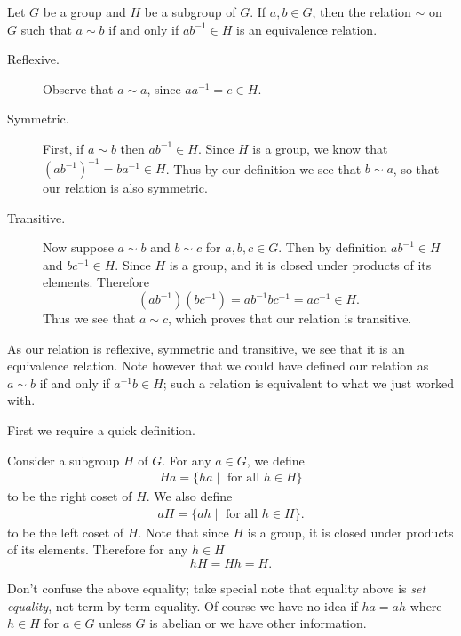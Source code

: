 \documentclass[12pt,letterpaper]{algebra_book}
\theoremstyle{definition}
\begin{document}
    Let $G$ be a group and $H$ be a subgroup of $G$. If $a, b \in G$, then the
    relation $\sim$ on $G$ such that $a \sim b$ if and only if $ab^{-1} \in H$
    is an equivalence relation.
  \begin{prf}
    \begin{description}
        \item[Reflexive.] Observe that $a \sim a$, since $aa^{-1} = e
        \in H$.

        \item[Symmetric.] First, if $a \sim b$ then $ab^{-1} \in H$. Since $H$ is a
        group, we know that $(ab^{-1})^{-1} = ba^{-1} \in H$.
        Thus by our definition we see that $b \sim a$, so that our
        relation is also symmetric. 

        \item[Transitive.] Now suppose $a \sim b$ and $b \sim c$ for
        $a, b, c \in G$. Then by definition $ab^{-1} \in H$ and
        $bc^{-1} \in H$. Since $H$ is a group, and it is closed under
        products of its elements. Therefore
        \[
            (ab^{-1})(bc^{-1}) = ab^{-1}bc^{-1} = ac^{-1} \in H.
        \]
        Thus we see that $a \sim c$, which proves that our
        relation is transitive.
    \end{description}
\end{prf}
    As our relation is reflexive, symmetric and transitive, we see
    that it is an equivalence relation. Note however that we could
    have defined our relation as $a \sim b$ if and only if $a^{-1}b
    \in H$; such a relation is equivalent to what we just worked with.

    First we require a quick definition.
    \begin{definition}
        Consider a subgroup $H$ of $G$. For any $a \in G$, we define
        \begin{align*}
            Ha = \{ha \mid \text{ for all }h \in H\}
        \end{align*}
        to be the right coset of $H$. We also define
        \begin{align*} 
            aH = \{ah \mid \text{ for all }h \in H\}. 
        \end{align*}
        to be the left coset of $H$.
        Note that since $H$ is a group, it is closed under products of
        its elements. Therefore for any $h\in H$
        \[
            hH = Hh = H.
        \]
    \end{definition}

    \textcolor{red!80}{Don't confuse the above equality; take special note that 
    equality above is \textit{set equality}, not term by term
    equality. Of course we have no idea if $ha = ah$ where $h \in H$
    for $a \in G$ unless $G$ is abelian or we have other information.}
    \\
\end{document}
